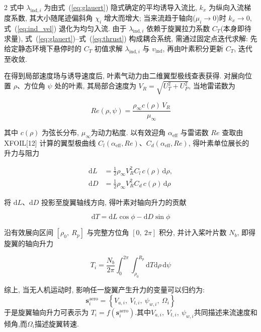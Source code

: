 \documentclass{aas}
\begin{document}
\begin{multicols}{2}
式中 $\lambda_{\mathrm{ind},i}$ 为由式~(\ref{eq:glauert}) 隐式确定的平均诱导入流比,
$k_x$ 为纵向入流梯度系数, 其大小随尾迹偏斜角 $\chi_i$ 增大而增大;
当来流趋于轴向($\mu_i\to0$)时 $k_x\to0$, 式~(\ref{eq:ind_vel}) 退化为均匀入流.
由于 $\lambda_{\mathrm{ind},i}$ 依赖于旋翼拉力系数 $C_T$(本身即待求量),
式~(\ref{eq:glauert})--式~(\ref{eq:thrust}) 构成耦合系统, 需通过固定点迭代求解:
先给定静态环境下悬停时的 $C_T$ 初值求解 $\lambda_{\mathrm{ind},i}$ 与 $v_{\mathrm{ind}}$,
再由叶素积分更新 $C_T$, 迭代至收敛.

\label{subsec:lift}

在得到局部速度场与诱导速度后, 叶素气动力由二维翼型极线查表获得. 对展向位置
$\rho$、方位角 $\psi$ 处的叶素, 其局部合速度为 $V_R=\sqrt{U_T^2+U_P^2}$,
当地雷诺数为

\begin{equation}
Re(\rho,\psi)=\frac{\rho_\infty c(\rho)\,V_R}{\mu_\infty}
\label{eq:Re}
\end{equation}

其中 $c(\rho)$ 为弦长分布, $\mu_\infty$为动力粘度.
以有效迎角 $\alpha_{\mathrm{eff}}$ 与雷诺数 $Re$ 查取由 XFOIL[12] 计算的翼型极曲线
$C_l(\alpha_{\mathrm{eff}},Re)$、$C_d(\alpha_{\mathrm{eff}},Re)$, 得叶素单位展长的
升力与阻力

\begin{equation}
\begin{aligned}
\mathrm{d}L&=\frac{1}{2}\rho_\infty V_R^2 C_l\,c(\rho)\,\mathrm{d}\rho,\\
\mathrm{d}D&=\frac{1}{2}\rho_\infty V_R^2 C_d\,c(\rho)\,\mathrm{d}\rho
\end{aligned}
\label{eq:dLdD}
\end{equation}

将 $\mathrm{d}L$、$\mathrm{d}D$ 投影至旋翼轴线方向, 得叶素对轴向升力的贡献

\begin{equation}
\mathrm{d}T=\mathrm{d}L\cos\phi-\mathrm{d}D\sin\phi
\label{eq:dT}
\end{equation}

沿有效展向区间 $[\rho_0,\ R_p]$ 与完整方位角 $[0,\ 2\pi]$ 积分, 并计入桨叶片数
$N_b$, 即得旋翼的轴向升力

\begin{equation}
T_i=\frac{N_b}{2\pi}\int_{0}^{2\pi}\!\!\int_{\rho_0}^{R_p}
\mathrm{d}T\mathrm{d}\rho\,\mathrm{d}\psi
\label{eq:thrust}
\end{equation}

综上, 当无人机运动时, 影响任一旋翼产生升力的变量可以归约为:
\begin{equation}
\bm{s}_i^{\mathrm{aero}}=\left\{V_{a,i},\ V_{t,i},\ \psi_{w,i}, \ \Omega_i\right\}
\label{eq:state_aero}
\end{equation}
于是旋翼轴向升力可表示为 $T_i=f\!\left(\bm{s}_i^{\mathrm{aero}}\right)$.其中$V_{a,i},\ V_{t,i},\ \psi_{w,i}$共同描述来流速度和倾角,而$\Omega_i$描述旋翼转速.


\end{multicols}
\end{document}
